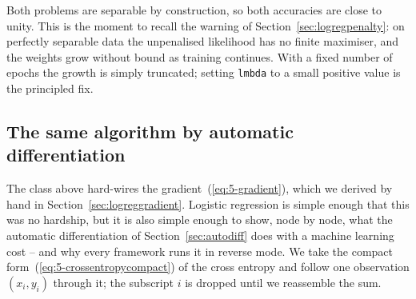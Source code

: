 Both problems are separable by construction, so both accuracies are close to
unity.  This is the moment to recall the warning of
Section~\ref{sec:logregpenalty}: on perfectly separable data the unpenalised
likelihood has no finite maximiser, and the weights grow without bound as
training continues.  With a fixed number of epochs the growth is simply
truncated; setting \texttt{lmbda} to a small positive value is the principled
fix.

\subsection{The same algorithm by automatic differentiation}
\label{sec:logregad}

The class above hard-wires the gradient~(\ref{eq:5-gradient}), which we
derived by hand in Section~\ref{sec:logreggradient}.  Logistic regression is
simple enough that this was no hardship, but it is also simple enough to
show, node by node, what the automatic differentiation of
Section~\ref{sec:autodiff} does with a machine learning cost -- and why
every framework runs it in reverse mode.  We take the compact
form~(\ref{eq:5-crossentropycompact}) of the cross entropy and follow one
observation $(x_i,y_i)$ through it; the subscript $i$ is dropped until we
reassemble the sum.

